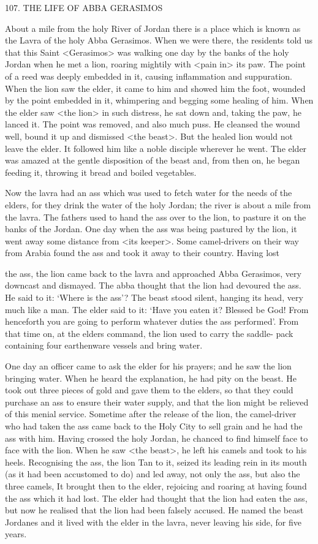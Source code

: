 107.
THE LIFE OF ABBA GERASIMOS

About a mile from the holy River of Jordan there is a place which
is known as the Lavra of the holy Abba Gerasimos.
When we were
there, the residents told us that this Saint <Gerasimos> was walking
one day by the banks of the holy Jordan when he met a lion,
roaring mightily with <pain in> its paw.
The point of a reed was
deeply embedded in it, causing inflammation and suppuration.
When the lion saw the elder, it came to him and showed him the
foot, wounded by the point embedded in it, whimpering and
begging some healing of him.
When the elder saw <the lion> in
such distress, he sat down and, taking the paw, he lanced it.
The
point was removed, and also much puss.
He cleansed the wound
well, bound it up and dismissed <the beast>.
But the healed lion
would not leave the elder.
It followed him like a noble disciple
wherever he went.
The elder was amazed at the gentle disposition of
the beast and, from then on, he began feeding it, throwing it bread
and boiled vegetables.

Now the lavra had an ass which was used to fetch water for the
needs of the elders, for they drink the water of the holy Jordan; the
river is about a mile from the lavra.
The fathers used to hand the
ass over to the lion, to pasture it on the banks of the Jordan.
One
day when the ass was being pastured by the lion, it went away some
distance from <its keeper>.
Some camel-drivers on their way from
Arabia found the ass and took it away to their country.
Having lost

the ass, the lion came back to the lavra and approached Abba
Gerasimos, very downcast and dismayed.
The abba thought that the
lion had devoured the ass.
He said to it: `Where is the ass'? The
beast stood silent, hanging its head, very much like a man.
The elder
said to it: `Have you eaten it? Blessed be God! From henceforth you
are going to perform whatever duties the ass performed'.
From that
time on, at the elder\textquotesingle s command, the lion used to carry the saddle-
pack containing four earthenware vessels and bring water.

One day an officer came to ask the elder for his prayers; and he
saw the lion bringing water.
When he heard the explanation, he had
pity on the beast.
He took out three pieces of gold and gave them
to the elders, so that they could purchase an ass to ensure their
water supply, and that the lion might be relieved of this menial
service.
Sometime after the release of the lion, the camel-driver who
had taken the ass came back to the Holy City to sell grain and he
had the ass with him.
Having crossed the holy Jordan, he chanced
to find himself face to face with the lion.
When he saw <the beast>,
he left his camels and took to his heels.
Recognising the ass, the lion
Tan to it, seized its leading rein in its mouth (as it had been
accustomed to do) and led away, not only the ass, but also the three
camels, It brought then to the elder, rejoicing and roaring at having
found the ass which it had lost.
The elder had thought that the lion
had eaten the ass, but now he realised that the lion had been falsely
accused.
He named the beast Jordanes and it lived with the elder in
the lavra, never leaving his side, for five years.

